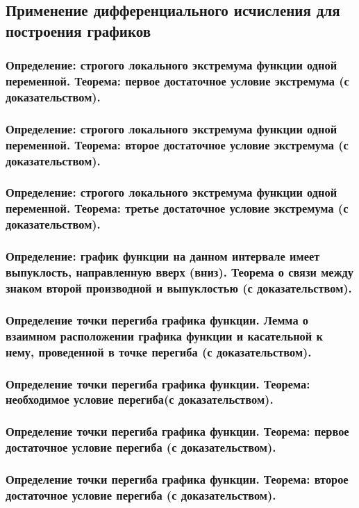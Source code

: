 \documentclass[10pt]{article}
\begin{document}
    \subsection{Применение дифференциального исчисления для построения графиков}
    \subsubsection{Определение: строгого локального экстремума функции одной переменной. Теорема: первое достаточное условие экстремума (с доказательством).}
    \subsubsection{Определение: строгого локального экстремума функции одной переменной. Теорема: второе достаточное условие экстремума (с доказательством).}
    \subsubsection{Определение: строгого локального экстремума функции одной переменной. Теорема: третье достаточное условие экстремума (с доказательством).}
    \subsubsection{Определение: график функции на данном интервале имеет выпуклость, направленную вверх (вниз). Теорема о связи между знаком второй производной и выпуклостью (с доказательством).}
    \subsubsection{Определение точки перегиба графика функции. Лемма о взаимном расположении графика функции и касательной к нему, проведенной в точке перегиба (с доказательством).}
    \subsubsection{Определение точки перегиба графика функции. Теорема: необходимое условие перегиба(с доказательством).}
    \subsubsection{Определение точки перегиба графика функции. Теорема: первое достаточное условие перегиба (с доказательством).}
    \subsubsection{Определение точки перегиба графика функции. Теорема: второе достаточное условие перегиба (с доказательством).}
\end{document}
